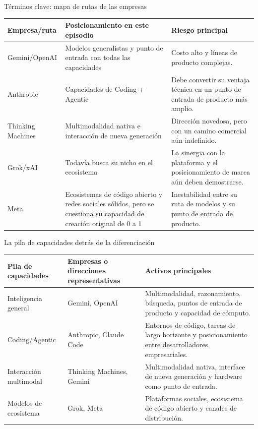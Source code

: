 \begin{knowledgebox}{Términos clave: mapa de rutas de las empresas}
\begin{tabularx}{\textwidth}{p{}p{}X}
\toprule
Empresa/ruta & Posicionamiento en este episodio & Riesgo principal \\
\midrule
Gemini/OpenAI & Modelos generalistas y punto de entrada con todas las capacidades & Costo alto y líneas de producto complejas. \\
Anthropic & Capacidades de Coding + Agentic & Debe convertir su ventaja técnica en un punto de entrada de producto más amplio. \\
Thinking Machines & Multimodalidad nativa e interacción de nueva generación & Dirección novedosa, pero con un camino comercial aún indefinido. \\
Grok/xAI & Todavía busca su nicho en el ecosistema & La sinergia con la plataforma y el posicionamiento de marca aún deben demostrarse. \\
Meta & Ecosistemas de código abierto y redes sociales sólidos, pero se cuestiona su capacidad de creación original de 0 a 1 & Inestabilidad entre su ruta de modelos y su punto de entrada de producto. \\
\bottomrule
\end{tabularx}
\end{knowledgebox}

\begin{knowledgebox}{La pila de capacidades detrás de la diferenciación}
\begin{tabularx}{\textwidth}{p{}p{}X}
\toprule
Pila de capacidades & Empresas o direcciones representativas & Activos principales \\
\midrule
Inteligencia general & Gemini, OpenAI & Multimodalidad, razonamiento, búsqueda, puntos de entrada de producto y capacidad de cómputo. \\
Coding/Agentic & Anthropic, Claude Code & Entornos de código, tareas de largo horizonte y posicionamiento entre desarrolladores empresariales. \\
Interacción multimodal & Thinking Machines, Gemini & Multimodalidad nativa, interface de nueva generación y hardware como punto de entrada. \\
Modelos de ecosistema & Grok, Meta & Plataformas sociales, ecosistema de código abierto y canales de distribución. \\
\bottomrule
\end{tabularx}
\end{knowledgebox}

